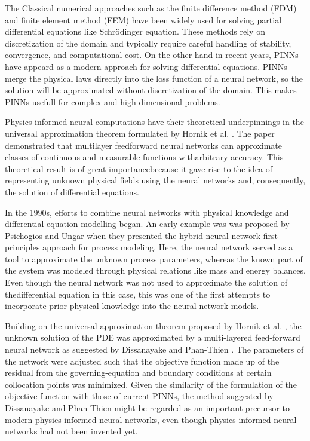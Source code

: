\documentclass[11pt]{article}
\begin{document}
The Classical numerical approaches such as the finite difference method (FDM) and finite element method (FEM) have been widely used for solving partial differential equations like Schrödinger equation. These methods rely on discretization of the domain and typically require careful handling of stability, convergence, and computational cost. On the other hand in recent years, PINNs have appeard as a modern approach for solving differential equations. PINNs merge the physical laws directly into the loss function of a neural network, so the solution will be approximated without discretization of the domain. This makes PINNs usefull for complex and high-dimensional problems.

Physics-informed neural computations have their theoretical underpinnings in the universal approximation theorem formulated by Hornik et al. \cite{hornikMultilayerFeedforwardNetworks1989}. The paper demonstrated that multilayer feedforward neural networks can approximate classes of continuous and measurable functions witharbitrary accuracy. This theoretical result is of great importancebecause it gave rise to the idea of representing unknown physical fields using the neural networks and, consequently, the solution of differential equations.

In the 1990s, efforts to combine neural networks with physical knowledge and differential equation modelling began. An early example was was proposed by Psichogios and Ungar \cite{psichogiosHybridNeuralNetworkfirst1992} when they presented the hybrid neural network-first-principles approach for process modeling. Here, the neural network served as a tool to approximate the unknown process parameters, whereas the known part of the system was modeled through physical relations like mass and energy balances. Even though the neural network was not used to approximate the solution of thedifferential equation in this case, this was one of the first attempts to incorporate prior physical knowledge into the neural network models.

Building on the universal approximation theorem proposed by Hornik et al. \cite{hornikMultilayerFeedforwardNetworks1989}, the unknown solution of the PDE was approximated by a multi-layered feed-forward neural network as suggested by Dissanayake and Phan-Thien \cite{dissanayakeNeuralnetworkbasedApproximationsSolving1994}. The parameters of the network were adjusted such that the objective function made up of the residual from the governing-equation and boundary conditions at certain collocation points was minimized. Given the similarity of the formulation of the objective function with those of current PINNs, the method suggested by Dissanayake and Phan-Thien might be regarded as an important precursor to modern physics-informed neural networks, even though physics-informed neural networks had not been invented yet.
\end{document}
